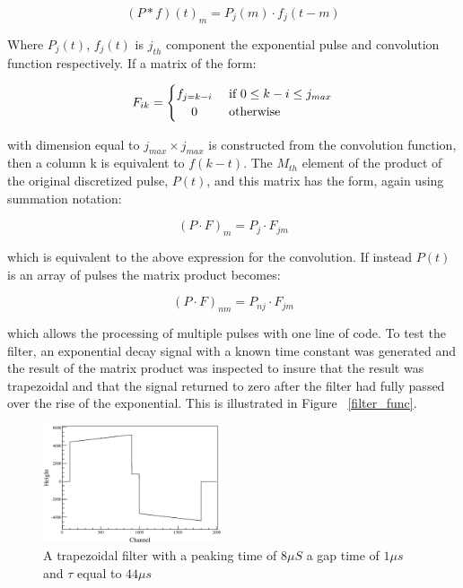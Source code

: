 \documentclass[twocolumn,preprintnumbers,superscriptaddress,amsmath,amssymb,floatfix]{revtex4-1}
\begin{document}
\begin{equation}
\label{conv_element}
(P*f)(t)_m = P_j(m) \cdot f_j(t-m)
\end{equation}

Where $P_j(t)$, $f_j(t)$ is $j_{th}$ component the exponential pulse and convolution function respectively. If a matrix of the form:  

\begin{equation}
\label{cond}
 F_{ik} =
  \begin{cases} 
      \hfill f_{j=k-i} \hfill & \text{ if $0 \leq k-i \leq j_{max}$} \\
      \hfill 0 \hfill & \text{ otherwise} \\
  \end{cases}
\end{equation}

\noindent with dimension equal to $ j_{max} \times j_{max} $ is constructed from the convolution function, then a column k is equivalent to $f(k-t)$. The $M_{th}$ element of the product of the original discretized pulse, $P(t)$, and this matrix has the form, again using summation notation:

\begin{equation}
\label{conv}
(P \cdot F)_{m} = P_{j} \cdot F_{jm}
\end{equation}

\noindent which is equivalent to the above expression for the convolution. If instead $P(t)$ is an array of pulses the matrix product becomes: 

\begin{equation}
\label{conv_full}
(P \cdot F)_{nm} = P_{nj} \cdot F_{jm}
\end{equation}

\noindent which allows the processing of multiple pulses with one line of code. To test the filter, an exponential decay signal with a known time constant was generated and the result of the matrix product was inspected to insure that the result was trapezoidal and that the signal returned to zero after the filter had fully passed over the rise of the exponential. This is illustrated in Figure ~\ref{filter_func}.



\begin{figure}
\includegraphics[width=0.47\textwidth]{filter.eps}
\caption{A trapezoidal filter with a peaking time of $8\mu S$ a gap time of $1 \mu s$ and $\tau$ equal to $44\mu s$ 
\label{filter}}
\end{figure}
\end{document}
